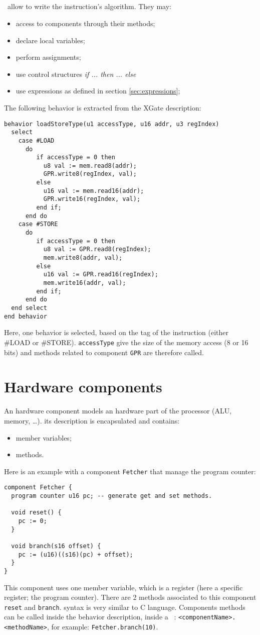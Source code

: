 \subsection{\Blocdo}
\label{sec:behDo}
\blocsdo\ allow to write the instruction's algorithm. They may:
\begin{itemize}
\item access to components through their methods;
\item declare local variables;
\item perform assignments;
\item use control structures  {\em if ... then ... else}
\item use expressions as defined in section \ref{sec:expressions};
\end{itemize}
The following behavior is extracted from the XGate description:
\begin{lstlisting}
behavior loadStoreType(u1 accessType, u16 addr, u3 regIndex)
  select
    case #LOAD
      do
         if accessType = 0 then
           u8 val := mem.read8(addr);
           GPR.write8(regIndex, val);
         else
           u16 val := mem.read16(addr);
           GPR.write16(regIndex, val);
         end if;
      end do
    case #STORE 
      do
         if accessType = 0 then
           u8 val := GPR.read8(regIndex);
           mem.write8(addr, val);
         else
           u16 val := GPR.read16(regIndex);
           mem.write16(addr, val);
         end if;
      end do
  end select
end behavior
\end{lstlisting}
Here, one behavior is selected, based on the tag of the instruction (either \#LOAD or \#STO\-RE).  {\tt accessType} give the size of the memory access (8 or 16 bits) and methods related to component \texttt{GPR} are therefore called.

\section{Hardware components}
\label{sec:component}
An hardware component models an hardware part of the processor (ALU, memory, \ldots). its description is encapsulated and contains:
\begin{itemize}
\item member variables;
\item methods.
\end{itemize}
Here is an example with a component  \texttt{Fetcher} that manage the program counter:
\begin{lstlisting}
component Fetcher {
  program counter u16 pc; -- generate get and set methods.

  void reset() {
    pc := 0;
  }

  void branch(s16 offset) {
    pc := (u16)((s16)(pc) + offset);
  }
}
\end{lstlisting}
This component uses one member variable, which is a register (here a specific register; the program counter). There are 2 methods associated to this component \texttt{reset} and \texttt{branch}. syntax is very similar to C language. Components methods can be called inside the behavior description, inside a  \blocdo\ : \texttt{<componentName>.<methodName>}, for example: \texttt{Fetcher.branch(10)}.


